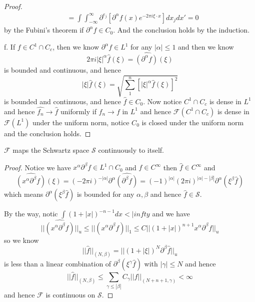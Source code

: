 \documentclass[lang=en, color=blue, ]{elegantbook}
\newcommand{\F}{\mathcal{F}}
\newcommand{\Sch}{\mathcal{S}}
\begin{document}
\begin{proof}
\[\begin{aligned}
    &= \int\int_{-\infty}^{\infty} \partial^{e_j}[\partial^{\alpha}f(x)e^{-2\pi i \xi \cdot x}]dx_j dx' = 0
    \end{aligned}
    \]
    by the Fubini's theorem if $\partial^{\alpha}f \in C_0$. And the conclusion holds by the induction.\par
    f. If $f\in C^1\cap C_c$, then we know $\partial^{\alpha} f \in L^1$ for any $|\alpha|\leq 1$ and then we know
    \[
    2\pi i|\xi|^{\alpha}\hat{f}(\xi) = \hat{(\partial^{\alpha} f)}(\xi)
    \]
    is bounded and continuous, and hence
    \[
    |\xi|\hat{f}(\xi) = \sqrt{\sum_1^n [|\xi|^{\alpha}\hat{f}(\xi)]^2}
    \]
    is bounded and continuous, and hence $\hat{f} \in C_0$. Now notice $C^1\cap C_c$ is dense in $L^1$ and hence $\hat{f_n} \to \hat{f}$ uniformly if $f_n \to f$ in $L^1$ and hence $\F(C^1\cap C_c)$ is dense in $\F(L^1)$ under the uniform norm, notice $C_0$ is closed under the uniform norm and the conclusion holds.
\end{proof}

\begin{corollary}
    $\F$ maps the Schwartz space $\Sch$ continuously to itself.
\end{corollary}
\begin{proof}\par
    Notice we have $x^{\alpha}\partial^{\beta} f\in L^1\cap C_0$ and $f\in C^{\infty}$ then $\hat{f}\in C^{\infty}$ and
    \[
    \hat{(x^{\alpha}\partial^{\beta}f)}(\xi) = (-2\pi i)^{-|\alpha|}\partial^{\alpha}\hat{(\partial^{\beta}f)} = (-1)^{|\alpha|}(2\pi i)^{|\alpha|-|\beta|}\partial^{\alpha}(\xi^{\beta}\hat{f})
    \]
    which means $\partial^{\alpha}(\xi^{\beta}\hat{f})$ is bounded for any $\alpha,\beta$ and hence $\hat{f} \in \Sch$.\par
    By the way, notic $\int (1+|x|)^{-n-1}dx<|infty$ and we have
    \[
    ||\hat{(x^{\alpha}\partial^{\beta}f)}||_u \leq ||(x^{\alpha}\partial^{\beta}f)||_1 \leq C||(1+|x|)^{n+1}x^{\alpha}\partial^{\beta}f||_u
    \]
    so we know
    \[
    ||\hat{f}||_{(N,\beta)} = ||(1+|\xi|)^N\partial^{\beta}\hat{f}||_u
    \]
    is less than a linear combination of $\partial^{\beta}(\xi^{\gamma}\hat{f})$ with $|\gamma| \leq N$ and hence
    \[
    ||\hat{f}||_{(N,\beta)} \leq \sum_{\gamma \leq |\beta|} C_{\gamma}||f||_{(N+n+1,\gamma)} < \infty 
    \]
    and hence $\F$ is continuous on $\Sch$.
\end{proof}
\end{document}
